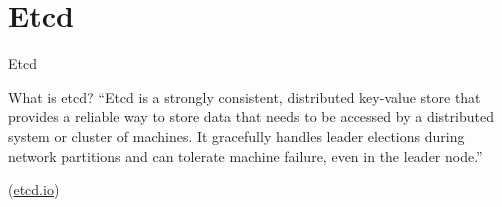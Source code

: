 \documentclass[presentation]{beamer}\mode<presentation>{\usetheme{AMSBolognaFC}}
\begin{document}
\section{Etcd}

\begin{frame}{Etcd}
	\begin{block}{What is etcd?}
		``Etcd is a strongly consistent, distributed key-value store that provides a reliable way to store data that needs to be accessed by a distributed system or cluster of machines.
        It gracefully handles leader elections during network partitions and can tolerate machine failure, even in the leader node.''
        \begin{flushright}
            (\href{https://etcd.io/}{etcd.io})
        \end{flushright}
	\end{block}
\end{frame}

\section*{}

\frame{\titlepage}

\section*{\refname}

\begin{frame}[c,noframenumbering]{\refname}
	\scriptsize
	
	
\end{frame}

\end{document}
